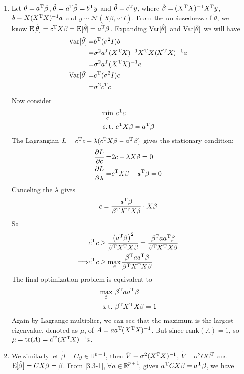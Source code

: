 \begin{sol}
\begin{enumerate}
\item
\label{3.3-1}
Let $\theta=a^{\mathrm{T}}\beta$, $\hat{\theta}=a^{\mathrm{T}}\hat{\beta}=b^{\mathrm{T}}y$ and $\tilde{\theta}=c^{\mathrm{T}}y$, where $\hat{\beta}=(X^{\mathrm{T}}X)^{-1}X^{\mathrm{T}}y$, $b=X(X^{\mathrm{T}}X)^{-1}a$ and $y\sim\mathcal{N}(X\beta,\sigma^2I)$. From the unbiasedness of $\tilde{\theta}$, we know $\operatorname{E}[\tilde{\theta}]=c^{\mathrm{T}}X\beta=\operatorname{E}[\hat{\theta}]=a^{\mathrm{T}}\beta$. Expanding $\operatorname{Var}[\hat{\theta}]$ and $\operatorname{Var}[\tilde{\theta}]$ we will have
\begin{align*}
\operatorname{Var}[\hat{\theta}] =& b^{\mathrm{T}}(\sigma^2 I)b\\
=& \sigma^2 a^{\mathrm{T}}(X^{\mathrm{T}}X)^{-1}X^{\mathrm{T}}X(X^{\mathrm{T}}X)^{-1}a\\
=& \sigma^2 a^{\mathrm{T}}(X^{\mathrm{T}}X)^{-1}a\\
\operatorname{Var}[\tilde{\theta}] =& c^{\mathrm{T}}(\sigma^2 I)c\\
=& \sigma^2 c^{\mathrm{T}}c
\end{align*}
Now consider
\begin{align*}
\min_c \ & \Tr{c}c\\
\st & \Tr{c}X\beta=\Tr{a}\beta
\end{align*}
The Lagrangian $L=c^{\mathrm{T}}c+\lambda(c^{\mathrm{T}}X\beta-a^{\mathrm{T}}\beta)$ gives the stationary condition:
\begin{align*}
\frac{\partial L}{\partial c}=& 2c+\lambda X\beta=0\\
\frac{\partial L}{\partial \lambda}=& c^{\mathrm{T}}X\beta-a^{\mathrm{T}}\beta=0
\end{align*}
Canceling the $\lambda$ gives
\[
c=\frac{a^{\mathrm{T}}\beta}{\beta^{\mathrm{T}}X^{\mathrm{T}}X\beta}\cdot X\beta
\]
So
\begin{align*}
& c^{\mathrm{T}}c\ge \frac{\left(a^{\mathrm{T}}\beta\right)^2}{\beta^{\mathrm{T}}X^{\mathrm{T}}X\beta}=\frac{\beta^{\mathrm{T}}aa^{\mathrm{T}}\beta}{\beta^{\mathrm{T}}X^{\mathrm{T}}X\beta}\\
\Longrightarrow & c^{\mathrm{T}}c\ge \max_\beta \frac{\beta^{\mathrm{T}}aa^{\mathrm{T}}\beta}{\beta^{\mathrm{T}}X^{\mathrm{T}}X\beta}
\end{align*}
The final optimization problem is equivalent to
\begin{align*}
\max_\beta \ & \Tr{\beta}a\Tr{a}\beta\\
\st & \Tr{\beta}\Tr{X}X\beta=1
\end{align*}
Again by Lagrange multiplier, we can see that the maximum is the largest eigenvalue, denoted as $\mu$, of $A=aa^{\mathrm{T}}(X^{\mathrm{T}}X)^{-1}$. But since $\mathrm{rank}(A)=1$, so $\mu=\operatorname{tr}(A)=a^{\mathrm{T}}(X^{\mathrm{T}}X)^{-1}a$.
\item We similarly let $\tilde{\beta}=Cy\in\mathbb{R}^{p+1}$, then $\hat{V}=\sigma^2(X^{\mathrm{T}}X)^{-1}$, $\tilde{V}=\sigma^2CC^{\mathrm{T}}$ and $\operatorname{E}[\tilde{\beta}]=CX\beta=\beta$. From \ref{3.3-1}, $\forall a\in\mathbb{R}^{p+1}$, given $a^{\mathrm{T}}CX\beta=a^{\mathrm{T}}\beta$, we have

\end{enumerate}
\end{sol}
